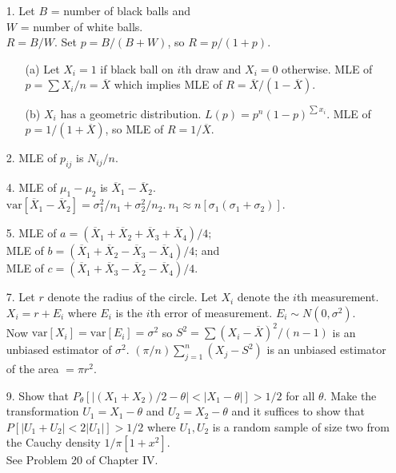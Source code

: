 \begin{enumerate}
	\item[1.] Let $B$ = number of black balls and \\
	$W$ = number of white balls. \\
	$R = B/W$. Set $p = B/(B+W)$, so $R = p/(1+p)$.
	\begin{enumerate}
		\item[(a)] Let $X_i=1$ if black ball on $i$th draw and $X_i=0$ otherwise.  MLE of $p=\sum X_i/n = \overline{X}$ which implies MLE of $R = \overline{X}/(1-\overline{X})$. 
		\item[(b)] $X_i$ has a geometric distribution. $L(p) = p^n(1-p)^{\sum x_i}$.  MLE of $p=1/(1+\overline{X})$, so MLE of $R = 1/\overline{X}$.
	\end{enumerate}
	
	\item[2.] MLE of $p_{ij}$ is $N_{ij}/n$.
	
	\item[4.] MLE of $\mu_1 - \mu_2$ is $\overline{X}_1-\overline{X}_2$. \\
	$\mbox{var}[\overline{X}_1-\overline{X}_2] = \sigma_1^2/n_1 + \sigma_2^2/n_2.\ n_1\approx n[\sigma_1(\sigma_1+\sigma_2)]$.
	
	\item[5.] MLE of $a = (\overline{X}_1 + \overline{X}_2 + \overline{X}_3 + \overline{X}_4)/4$; \\
	MLE of $b = (\overline{X}_1 + \overline{X}_2 - \overline{X}_3 - \overline{X}_4)/4$; and \\
	MLE of $c = (\overline{X}_1 + \overline{X}_3 - \overline{X}_2 - \overline{X}_4)/4$.
	
	\item[7.] Let $r$ denote the radius of the circle. Let $X_i$ denote the $i$th measurement. \\
	$X_i = r +E_i$ where $E_i$ is the $i$th error of measurement. $E_i\sim N(0,\sigma^2)$. \\
	Now $\mbox{var}[X_i] = \mbox{var}[E_i] = \sigma^2$ so $S^2 = \sum(X_i-\overline{X})^2/(n-1)$ is an unbiased estimator of $\sigma^2$. $(\pi/n)\displaystyle \sum_{j=1}^n(X_j-S^2)$ is an unbiased estimator of the area $= \pi r^2$. 
	
	\item[9.] Show that $P_\theta[\vert(X_1+X_2)/2-\theta\vert < \vert X_1-\theta\vert] > 1/2$ for all $\theta$. Make the transformation $U_1 = X_1-\theta$ and $U_2 = X_2-\theta$ and it suffices to show that $P[\vert U_1+U_2\vert < 2\vert U_1\vert] > 1/2$ where $U_1, U_2$ is a random sample of size two from the Cauchy density $1/\pi[1+x^2]$. \\
	See Problem 20 of Chapter IV. 
	

\end{enumerate}

